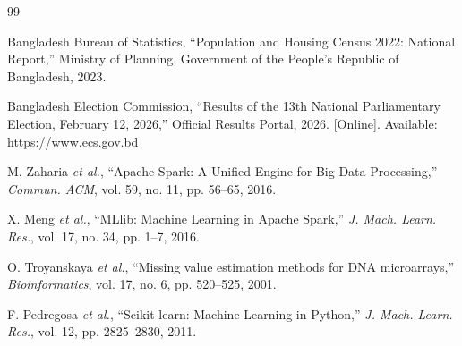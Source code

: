 \documentclass[conference]{IEEEtran}
\begin{document}
\balance
\begin{thebibliography}{99}

Bangladesh Bureau of Statistics, ``Population and Housing Census 2022: National Report,'' Ministry of Planning, Government of the People's Republic of Bangladesh, 2023.

Bangladesh Election Commission, ``Results of the 13th National Parliamentary Election, February 12, 2026,'' Official Results Portal, 2026. [Online]. Available: \url{https://www.ecs.gov.bd}

M. Zaharia \emph{et al.}, ``Apache Spark: A Unified Engine for Big Data Processing,'' \textit{Commun. ACM}, vol. 59, no. 11, pp. 56--65, 2016.

X. Meng \emph{et al.}, ``MLlib: Machine Learning in Apache Spark,'' \textit{J. Mach. Learn. Res.}, vol. 17, no. 34, pp. 1--7, 2016.

O. Troyanskaya \emph{et al.}, ``Missing value estimation methods for DNA microarrays,'' \textit{Bioinformatics}, vol. 17, no. 6, pp. 520--525, 2001.

F. Pedregosa \emph{et al.}, ``Scikit-learn: Machine Learning in Python,'' \textit{J. Mach. Learn. Res.}, vol. 12, pp. 2825--2830, 2011.

\end{thebibliography}
\end{document}
